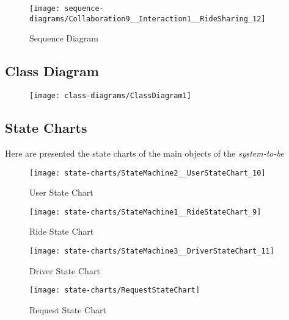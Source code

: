\begin{figure}[h!t]
\caption{Sequence Diagram}
\texttt{[image: sequence-diagrams/Collaboration9\_\_Interaction1\_\_RideSharing\_12]}
\centering
\end{figure}

\newpage
\subsection{Class Diagram} 
\begin{figure}[h!t]
\texttt{[image: class-diagrams/ClassDiagram1]}
\centering
\end{figure}
\newpage

\subsection{State Charts} 
Here are presented the state charts of the main objects of the \emph{system-to-be}

\begin{figure}[h!]
\caption{User State Chart}
\texttt{[image: state-charts/StateMachine2\_\_UserStateChart\_10]}
\centering
\end{figure}

\newpage
\vfill
\begin{figure}
\caption{Ride State Chart}
\texttt{[image: state-charts/StateMachine1\_\_RideStateChart\_9]}
\centering
\end{figure}
\vfill
\clearpage


\newpage
\vfill
\begin{figure}
\caption{Driver State Chart}
\texttt{[image: state-charts/StateMachine3\_\_DriverStateChart\_11]}
\centering
\end{figure}
\vfill
\clearpage

\newpage
\vfill
\begin{figure}
\caption{Request State Chart}
\texttt{[image: state-charts/RequestStateChart]}
\centering
\end{figure}
\vfill
\clearpage
